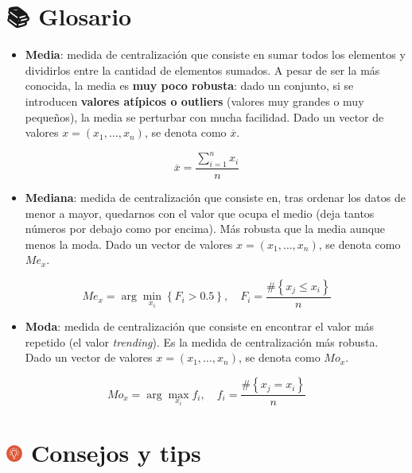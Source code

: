 \documentclass[11pt,]{book}
\providecommand{\tightlist}{%
  \setlength{\itemsep}{0pt}\setlength{\parskip}{0pt}}
\begin{document}
\hypertarget{glosario3}{%
\section{📚 Glosario}\label{glosario3}}

\begin{itemize}
\tightlist
\item
  \textbf{Media}: medida de centralización que consiste en sumar todos los elementos y dividirlos entre la cantidad de elementos sumados. A pesar de ser la más conocida, la media es \textbf{muy poco robusta}: dado un conjunto, si se introducen \textbf{valores atípicos o outliers} (valores muy grandes o muy pequeños), la media se perturbar con mucha facilidad. Dado un vector de valores \(x = (x_1, \ldots, x_n)\), se denota como \(\overline{x}\).
\end{itemize}

\[\overline{x} = \frac{\displaystyle \sum_{i=1}^{n}x_i}{n}\]

\begin{itemize}
\tightlist
\item
  \textbf{Mediana}: medida de centralización que consiste en, tras ordenar los datos de menor a mayor, quedarnos con el valor que ocupa el medio (deja tantos números por debajo como por encima). Más robusta que la media aunque menos la moda. Dado un vector de valores \(x = (x_1, \ldots, x_n)\), se denota como \(Me_x\).
\end{itemize}

\[Me_x = \displaystyle \arg \min_{x_i} \left\lbrace F_i > 0.5 \right\rbrace, \quad F_i = \frac{\#\left\lbrace x_j \leq x_i \right\rbrace}{n}\]

\begin{itemize}
\tightlist
\item
  \textbf{Moda}: medida de centralización que consiste en encontrar el valor más repetido (el valor \emph{trending}). Es la medida de centralización más robusta. Dado un vector de valores \(x = (x_1, \ldots, x_n)\), se denota como \(Mo_x\).
\end{itemize}

\[Mo_x = \displaystyle \arg \max_{x_i} f_i  , \quad f_i = \frac{\#\left\lbrace x_j = x_i \right\rbrace}{n}\]

\hypertarget{consejos-y-tips-2}{%
\section[ Consejos y tips]{\texorpdfstring{\protect\includegraphics[width=0.04\textwidth,height=\textheight]{img/logo_info.png} Consejos y tips}{ Consejos y tips}}\label{consejos-y-tips-2}}
\end{document}
